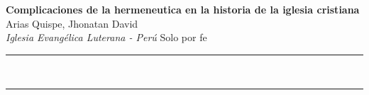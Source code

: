 \documentclass[a4paper,12pt]{article}
\renewenvironment{abstract}
 {\par\noindent\textbf{\abstractname}\ \ignorespaces \\}
 {\par\noindent\medskip}
\begin{document}
\pagestyle{fancy}
\thispagestyle{empty}
\fancyhead[L]{}
\renewcommand*{\thefootnote}{\fnsymbol{footnote}}
\begin{center}
\Large{\textbf{Complicaciones de la hermeneutica en la historia de la iglesia cristiana}}
\vspace{0.4cm}
\normalsize
\\ Arias Quispe, Jhonatan David \\
\vspace{0.1cm}
\textit{Iglesia Evangélica Luterana - Perú}
\small{Solo por fe}
\medskip
\normalsize
\end{center}
{\color{gray}\hrule}
\vspace{0.4cm}
\begin{abstract}

\end{abstract}
{\color{gray}\hrule}
\medskip






% 


\end{document}

